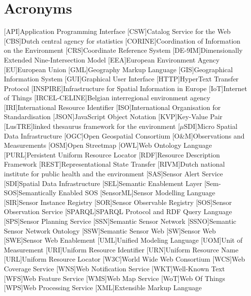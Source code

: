 \chapter*{Acronyms}

\begin{acronym}[UML]
  [API]{Application Programming Interface}
  [CSW]{Catalog Service for the Web}
  [CBS]{Dutch central agency for statistics}
  [CORINE]{Coordination of Information on the Environment} 
  [CRS]{Coordinate Reference System} 
  [DE-9IM]{Dimensionally Extended Nine-Intersection Model}
  [EEA]{European Environment Agency}
  [EU]{European Union}
  [GML]{Geography Markup Language}
  [GIS]{Geographical Information System}
  [GUI]{Graphical User Interface}
  [HTTP]{HyperText Transfer Protocol}
  [INSPIRE]{Infrastructure for Spatial Information in Europe}
  [IoT]{Internet of Things}
  [IRCEL-CELINE]{Belgian interregional environment agency}
  [IRI]{International Resource Identifier}
  [ISO]{International Organisation for Standardisation}
  [JSON]{JavaScript Object Notation}
  [KVP]{Key-Value Pair}
  [LusTRE]{linked thesaurus framework for the environment} 
  [$\mu$SDI]{Micro Spatial Data Infrastructure}
  [OGC]{Open Geospatial Consortium}
  [O\&M]{Observations and Measurements}
  [OSM]{Open Streetmap}
  [OWL]{Web Ontology Language}
  [PURL]{Persistent Uniform Resource Locator}
  [RDF]{Resource Description Framework}
  [REST]{Representational State Transfer}
  [RIVM]{Dutch national institute for public health and the environment}
  [SAS]{Sensor Alert Service}
  [SDI]{Spatial Data Infrastructure}
  [SEL]{Semantic Enablement Layer}
  [Sem-SOS]{Semantically Enabled SOS}
  [SensorML]{Sensor Modelling Language}
  [SIR]{Sensor Instance Registry}
  [SOR]{Sensor Observable Registry}
  [SOS]{Sensor Observation Service}
  [SPARQL]{SPARQL Protocol and RDF Query Language}
  [SPS]{Sensor Planning Service}
  [SSN]{Semantic Sensor Network}
  [SSNO]{Semantic Sensor Network Ontology}
  [SSW]{Semantic Sensor Web}
  [SW]{Sensor Web}
  [SWE]{Sensor Web Enablement}
  [UML]{Unified Modeling Language}
  [UOM]{Unit of Measurement}
  [URI]{Uniform Resource Identifier}
  [URN]{Uniform Resource Name}
  [URL]{Uniform Resource Locator}
  [W3C]{World Wide Web Consortium}
  [WCS]{Web Coverage Service}
  [WNS]{Web Notification Service}
  [WKT]{Well-Known Text}
  [WFS]{Web Feature Service}
  [WMS]{Web Map Service}
  [WoT]{Web Of Things}
  [WPS]{Web Processing Service}
  [XML]{Extensible Markup Language}
\end{acronym}